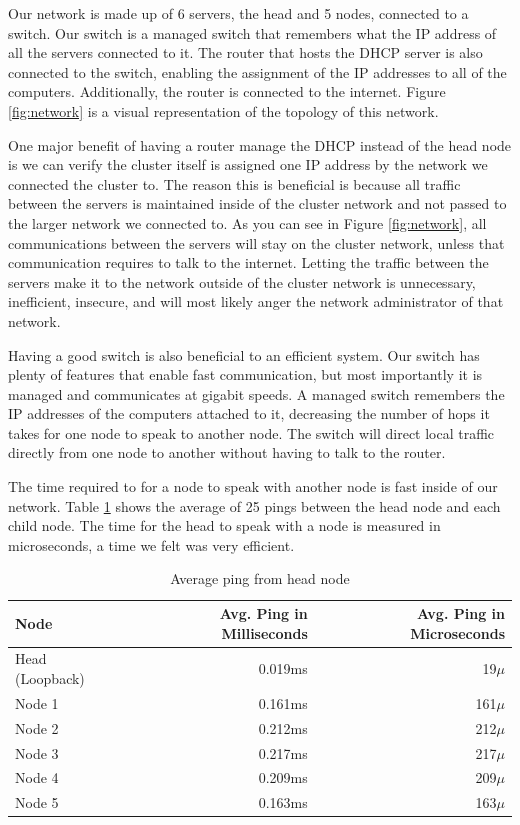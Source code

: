 \documentclass[12pt]{article}
\begin{document}
Our network is made up of 6 servers, the head and 5 nodes, connected to a switch. Our switch is a managed switch that remembers what the IP address of all the servers connected to it. The router that hosts the DHCP server is also connected to the switch, enabling the assignment of the IP addresses to all of the computers. Additionally, the router is connected to the internet. Figure \ref{fig:network} is a visual representation of the topology of this network.

One major benefit of having a router manage the DHCP instead of the head node is we can verify the cluster itself is assigned one IP address by the network we connected the cluster to. The reason this is beneficial is because all traffic between the servers is maintained inside of the cluster network and not passed to the larger network we connected to. As you can see in Figure \ref{fig:network}, all communications between the servers will stay on the cluster network, unless that communication requires to talk to the internet. Letting the traffic between the servers make it to the network outside of the cluster network is unnecessary, inefficient, insecure, and will most likely anger the network administrator of that network.

Having a good switch is also beneficial to an efficient system. Our switch has plenty of features that enable fast communication, but most importantly it is managed and communicates at gigabit speeds. A managed switch remembers the IP addresses of the computers attached to it, decreasing the number of hops it takes for one node to speak to another node. The switch will direct local traffic directly from one node to another without having to talk to the router. 

The time required to for a node to speak with another node is fast inside of our network. Table \ref{tab:ping} shows the average of 25 pings between the head node and each child node. The time for the head to speak with a node is measured in microseconds, a time we felt was very efficient.

\begin{table}[htb!]
    \centering
    \begin{tabular}{lrr}
        Node  &   Avg. Ping in Milliseconds  &  Avg. Ping in Microseconds\\
        \hline
        Head (Loopback) &   0.019ms     &   19$\mu$\\
        Node 1          &   0.161ms     &   161$\mu$\\
        Node 2          &   0.212ms     &   212$\mu$\\
        Node 3          &   0.217ms     &   217$\mu$\\
        Node 4          &   0.209ms     &   209$\mu$\\
        Node 5          &   0.163ms     &   163$\mu$\\
    \end{tabular}
    \caption{Average ping from head node}
    \label{tab:ping}
\end{table}
\end{document}
